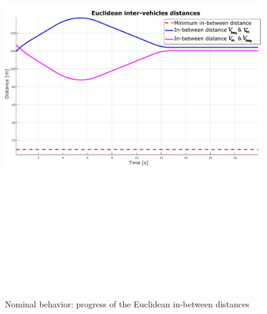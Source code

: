     \begin{figure}[!h]
        \centering 
        \includegraphics[width=12cm,height=18cm,keepaspectratio]{chapters/Chapitre_6/Nominal_Distances.pdf}
        \caption{Nominal behavior: progress of the Euclidean in-between distances}
        \label{fig:nominal_distances}
        \end{figure}


